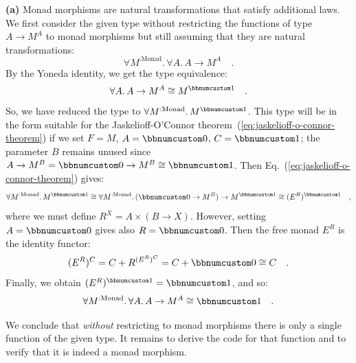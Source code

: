\textbf{(a)} Monad morphisms are natural transformations that satisfy
additional laws. We first consider the given type without restricting
the functions of type $A\rightarrow M^{A}$ to monad morphisms but
still assuming that they are natural transformations:
\[
\forall M^{:\text{Monad}}.\,\forall A.\,A\rightarrow M^{A}\quad.
\]
By the Yoneda identity, we get the type equivalence: 
\[
\forall A.\,A\rightarrow M^{A}\cong M^{\bbnum 1}\quad.
\]
So, we have reduced the type to $\forall M^{:\text{Monad}}.\,M^{\bbnum 1}$.
This type will be in the form suitable for the Jaskelioff-O\textsf{'}Connor
theorem~(\ref{eq:jaskelioff-o-connor-theorem}) if we set $F=M$,
$A=\bbnum 0$, $C=\bbnum 1$; the parameter $B$ remains unused since
$A\rightarrow M^{B}=\bbnum 0\rightarrow M^{B}\cong\bbnum 1$. Then
Eq.~(\ref{eq:jaskelioff-o-connor-theorem}) gives:
\[
\forall M^{:\text{Monad}}.\,M^{\bbnum 1}\cong\forall M^{:\text{Monad}}.\,(\bbnum 0\rightarrow M^{B})\rightarrow M^{\bbnum 1}\cong(E^{R})^{\bbnum 1}\quad,
\]
where we must define $R^{X}=A\times(B\rightarrow X)$. However, setting
$A=\bbnum 0$ gives also $R=\bbnum 0$. Then the free monad $E^{R}$
is the identity functor: 
\[
(E^{R})^{C}=C+R^{(E^{R})^{C}}=C+\bbnum 0\cong C\quad.
\]
Finally, we obtain $(E^{R})^{\bbnum 1}=\bbnum 1$, and so:
\[
\forall M^{:\text{Monad}}.\,\forall A.\,A\rightarrow M^{A}\cong\bbnum 1\quad.
\]

We conclude that \emph{without} restricting to monad morphisms there
is only a single function of the given type. It remains to derive
the code for that function and to verify that it is indeed a monad
morphism.

